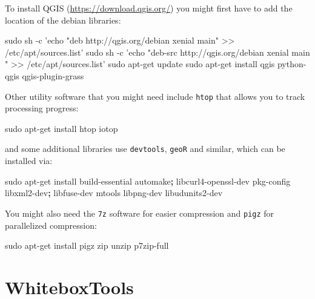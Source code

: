 \documentclass[graybox,natbib,nospthms,UStrade]{svmono}
\newenvironment{Shaded}{\begin{snugshade}}{\end{snugshade}}
\newcommand{\ExtensionTok}[1]{#1}
\newcommand{\FunctionTok}[1]{\textcolor[rgb]{0,0,0}{#1}}
\newcommand{\KeywordTok}[1]{\textcolor[rgb]{0.27,0.27,0.27}{\textbf{#1}}}
\newcommand{\NormalTok}[1]{#1}
\newcommand{\StringTok}[1]{\textcolor[rgb]{0.5,0.5,0.5}{#1}}
\begin{document}
To install QGIS (\url{https://download.qgis.org/}) you might first have to add the location of the debian libraries:

\begin{Shaded}
\begin{Highlighting}[]
\FunctionTok{sudo}\NormalTok{ sh -c }\StringTok{'echo "deb http://qgis.org/debian xenial main" >> /etc/apt/sources.list'}  
\FunctionTok{sudo}\NormalTok{ sh -c }\StringTok{'echo "deb-src http://qgis.org/debian xenial main " >> /etc/apt/sources.list'}  
\FunctionTok{sudo}\NormalTok{ apt-get update }
\FunctionTok{sudo}\NormalTok{ apt-get install qgis python-qgis qgis-plugin-grass}
\end{Highlighting}
\end{Shaded}

Other utility software that you might need include \texttt{htop} that allows you to track processing progress:

\begin{Shaded}
\begin{Highlighting}[]
\FunctionTok{sudo}\NormalTok{ apt-get install htop iotop}
\end{Highlighting}
\end{Shaded}

and some additional libraries use \texttt{devtools}, \texttt{geoR} and similar, which can be installed via:

\begin{Shaded}
\begin{Highlighting}[]
\FunctionTok{sudo}\NormalTok{ apt-get install build-essential automake}\KeywordTok{;} 
        \ExtensionTok{libcurl4-openssl-dev}\NormalTok{ pkg-config libxml2-dev}\KeywordTok{;}
        \ExtensionTok{libfuse-dev}\NormalTok{ mtools libpng-dev libudunits2-dev}
\end{Highlighting}
\end{Shaded}

You might also need the \texttt{7z} software for easier compression and \texttt{pigz} for parallelized compression:

\begin{Shaded}
\begin{Highlighting}[]
\FunctionTok{sudo}\NormalTok{ apt-get install pigz zip unzip p7zip-full }
\end{Highlighting}
\end{Shaded}

\hypertarget{Whitebox}{%
\section{WhiteboxTools}\label{Whitebox}}
\end{document}
